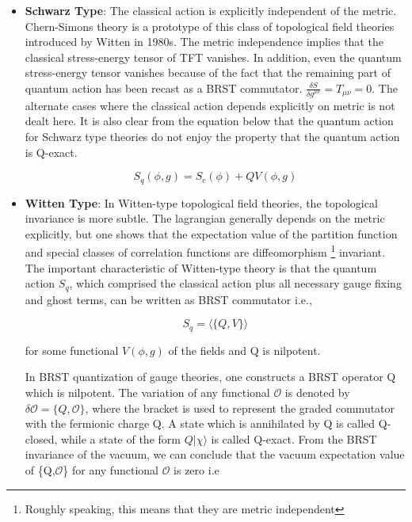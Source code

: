 \begin{itemize} 
\item \textbf{Schwarz Type}: The classical action is explicitly independent of the metric. Chern-Simons theory is a 
prototype of this class of topological field theories introduced by Witten in 1980s. The metric independence implies 
that the classical stress-energy tensor of TFT vanishes. In addition, even the quantum stress-energy tensor vanishes 
because of the fact that the remaining part of quantum action has been recast as a BRST commutator.  
$ \frac{\delta S}{\delta g^{\mu\nu}} = T_{\mu\nu} = 0 $. The alternate cases where the classical action depends 
explicitly on metric is not dealt here. It is also clear from the equation below that the quantum action for Schwarz 
type theories do not enjoy the property that the quantum action is Q-exact. 



\begin{equation}
S_{q}(\phi, g) = S_{c}(\phi) + QV(\phi,g) 
\end{equation}



\item \textbf{Witten Type}: In Witten-type topological field theories, the topological invariance is more subtle. 
The lagrangian generally depends on the metric explicitly, but one shows that the expectation value of the 
partition function and special classes of correlation functions are diffeomorphism \footnote{Roughly speaking, 
this means that they are metric independent} invariant. 
The important characteristic of Witten-type theory is that the quantum action $S_{q}$, which comprised the 
classical action plus all necessary gauge fixing and ghost terms, 
can be written as BRST commutator i.e.,

\begin{equation}
S_{q} = \langle \{Q, V\}\rangle 
\end{equation}

for some functional $V(\phi,g)$ of the fields and Q is nilpotent. 



In BRST quantization of gauge theories, one constructs a BRST operator Q which is nilpotent. 
The variation of any functional $\mathcal{O}$ is denoted by $
\delta\mathcal{O} = \{Q,\mathcal{O}\} $, where the bracket is used to represent the graded commutator 
with the fermionic charge Q. A state which is annihilated by Q is called Q-closed, while a state of the 
form $ Q|\chi\rangle$ is called Q-exact. From the BRST invariance of the vacuum, we can conclude 
that the vacuum expectation value of \{Q,$\mathcal{O}$\} for any functional $\mathcal{O}$ is zero i.e 


\end{itemize}
